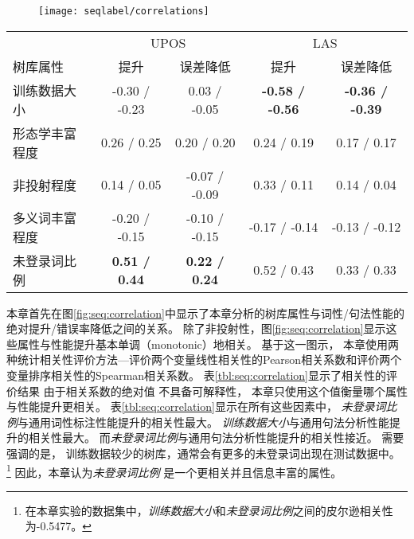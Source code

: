 \begin{figure}[t]
	\texttt{[image: seqlabel/correlations]}
\end{figure}
\begin{table}[t]
	\vspace{0.5em}\centering\wuhao
	\begin{tabular}{lcccc}
		\toprule[1.5pt]
		& \multicolumn{2}{c}{UPOS} & \multicolumn{2}{c}{LAS} \\
		树库属性 & 提升 & 误差降低 & 提升 & 误差降低 \\
		\midrule[1pt]
		训练数据大小 & -0.30 / -0.23 & 0.03 / -0.05 & \bf -0.58 / -0.56 & \bf -0.36 / -0.39 \\
形态学丰富程度 & 0.26 / 0.25 & 0.20 / 0.20 & 0.24 / 0.19 & 0.17 / 0.17 \\
非投射程度 & 0.14 / 0.05 & -0.07 / -0.09 & 0.33 / 0.11 & 0.14 / 0.04 \\
多义词丰富程度 & -0.20 / -0.15 & -0.10 / -0.15 & -0.17 / -0.14 & -0.13 / -0.12 \\
未登录词比例 &\bf  0.51 / 0.44 & \bf 0.22 / 0.24 & 0.52 / 0.43 & 0.33 / 0.33 \\
		\bottomrule[1.5pt]
	\end{tabular}
\end{table}

本章首先在图\ref{fig:seq:correlation}中显示了本章分析的树库属性与词性/句法性能的绝对提升/错误率降低之间的关系。
除了非投射性，图\ref{fig:seq:correlation}显示这些属性与性能提升基本单调（monotonic）地相关。
基于这一图示，
本章使用两种统计相关性评价方法---评价两个变量线性相关性的Pearson相关系数和评价两个变量排序相关性的Spearman相关系数。
表\ref{tbl:seq:correlation}显示了相关性的评价结果
由于相关系数的绝对值
不具备可解释性，
本章只使用这个值衡量哪个属性
与性能提升更相关。
表\ref{tbl:seq:correlation}显示在所有这些因素中，
\textit{未登录词比例}与通用词性标注性能提升的相关性最大。
\textit{训练数据大小}与通用句法分析性能提升的相关性最大。
而\textit{未登录词比例}与通用句法分析性能提升的相关性接近。
需要强调的是，
训练数据较少的树库，通常会有更多的未登录词出现在测试数据中。
\footnote{在本章实验的数据集中，\textit{训练数据大小}和\textit{未登录词比例}之间的皮尔逊相关性为-0.5477。}
因此，本章认为\textit{未登录词比例} 是一个更相关并且信息丰富的属性。


